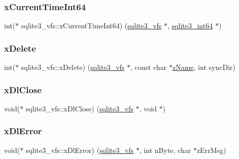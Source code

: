 \mbox{\label{structsqlite3__vfs_a2a344dbc5e4625343d992546fbff5421}} 
\subsubsection{\texorpdfstring{xCurrentTimeInt64}{xCurrentTimeInt64}}
{\footnotesize\ttfamily int($\ast$ sqlite3\+\_\+vfs\+::x\+Current\+Time\+Int64) (\mbox{\hyperlink{structsqlite3__vfs}{sqlite3\+\_\+vfs}} $\ast$, \mbox{\hyperlink{sqlite3_8h_a0a4d3e6c1ad46f90e746b920ab6ca0d2}{sqlite3\+\_\+int64}} $\ast$)}

\mbox{\label{structsqlite3__vfs_a9a84baca80b7ab2da9fb147cb40c73d2}} 
\subsubsection{\texorpdfstring{xDelete}{xDelete}}
{\footnotesize\ttfamily int($\ast$ sqlite3\+\_\+vfs\+::x\+Delete) (\mbox{\hyperlink{structsqlite3__vfs}{sqlite3\+\_\+vfs}} $\ast$, const char $\ast$\mbox{\hyperlink{structsqlite3__vfs_a0f06a27ac2201ea04c0623ef19e5d73e}{z\+Name}}, int sync\+Dir)}

\mbox{\label{structsqlite3__vfs_a0cbdab1584e0e2a80b32b2c335f17f99}} 
\subsubsection{\texorpdfstring{xDlClose}{xDlClose}}
{\footnotesize\ttfamily void($\ast$ sqlite3\+\_\+vfs\+::x\+Dl\+Close) (\mbox{\hyperlink{structsqlite3__vfs}{sqlite3\+\_\+vfs}} $\ast$, void $\ast$)}

\mbox{\label{structsqlite3__vfs_ace296f3efa5d1a490c892069891f37c0}} 
\subsubsection{\texorpdfstring{xDlError}{xDlError}}
{\footnotesize\ttfamily void($\ast$ sqlite3\+\_\+vfs\+::x\+Dl\+Error) (\mbox{\hyperlink{structsqlite3__vfs}{sqlite3\+\_\+vfs}} $\ast$, int n\+Byte, char $\ast$z\+Err\+Msg)}

